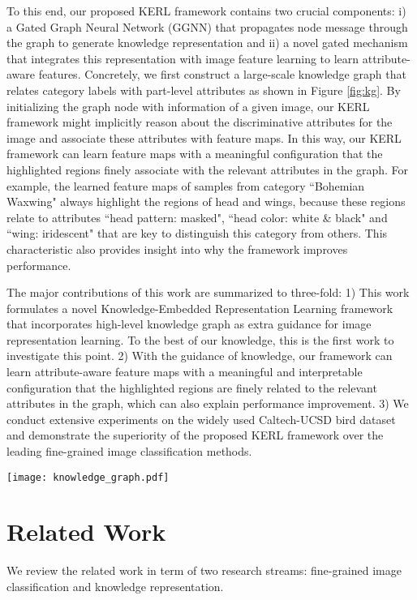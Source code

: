 \documentclass{article}
\begin{document}
To this end, our proposed KERL framework contains two crucial components: i) a Gated Graph Neural Network (GGNN) \cite{li2015gated} that propagates node message through the graph to generate knowledge representation and ii) a novel gated mechanism that integrates this representation with image feature learning to learn attribute-aware features. Concretely, we first construct a large-scale knowledge graph that relates category labels with part-level attributes as shown in Figure \ref{fig:kg}. By initializing the graph node with information of a given image, our KERL framework might implicitly reason about the discriminative attributes for the image and associate these attributes with feature maps. In this way, our KERL framework can learn feature maps with a meaningful configuration that the highlighted regions finely associate with the relevant attributes in the graph. For example, the learned feature maps of samples from category ``Bohemian Waxwing" always highlight the regions of head and wings, because these regions relate to attributes ``head pattern: masked", ``head color: white \& black" and ``wing: iridescent" that are key to distinguish this category from others. This characteristic also provides insight into why the framework improves performance.

The major contributions of this work are summarized to three-fold: 1) This work formulates a novel Knowledge-Embedded Representation Learning framework that incorporates high-level knowledge graph as extra guidance for image representation learning. To the best of our knowledge, this is the first work to investigate this point. 2) With the guidance of knowledge, our framework can learn attribute-aware feature maps with a meaningful and interpretable configuration that the highlighted regions are finely related to the relevant attributes in the graph, which can also explain performance improvement. 3) We conduct extensive experiments on the widely used Caltech-UCSD bird dataset \cite{wah2011caltech} and demonstrate the superiority of the proposed KERL framework over the leading fine-grained image classification methods.


\begin{figure*}[htbp]
   \centering
   \texttt{[image: knowledge\_graph.pdf]} %
   \caption{An example knowledge graph for modeling the category-attribute correlations on the Caltech-UCSD bird dataset.}
   \label{fig:kg}
\end{figure*}

\section{Related Work}
We review the related work in term of two research streams: fine-grained image classification and knowledge representation.
\end{document}
